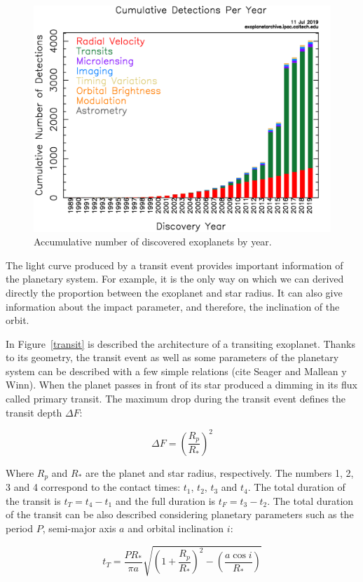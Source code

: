 \begin{figure}[H]
\centering
\includegraphics[width=0.7\columnwidth]{imagenes/exo_dischist_cumulative.png}
\caption{Accumulative number of discovered exoplanets by year.}
\label{amount_exoplanet}
\end{figure}

The light curve produced by a transit event provides important information of the planetary system. For example, it is the only way on which we can derived directly the proportion between the exoplanet and star radius. It can also give information about the impact parameter, and therefore, the inclination of the orbit. 

In Figure~\ref{transit} is described the architecture of a transiting exoplanet. Thanks to its geometry, the transit event as well as some parameters of the planetary system can be described with a few simple relations (cite Seager and Mallean y Winn).  When the planet passes in front of its star produced a dimming in its flux called primary transit. The maximum drop during the transit event defines the transit depth $\Delta{F}$:

\begin{equation}
    \Delta{F} = \left(\frac{R_{p}}{R_{*}}\right)^2 
\end{equation}

Where $R_{p}$ and $R_{*}$ are the planet and star radius, respectively. The numbers 1, 2, 3 and 4 correspond to the contact times: $t_{1}$, $t_{2}$, $t_{3}$ and $t_{4}$. The total duration of the transit is $t_{T} = t_{4}-t_{1}$ and the full duration is $t_{F}=t_{3}-t_{2}$. The total duration of the transit can be also described considering planetary parameters such as the period $P$, semi-major axis $a$ and orbital inclination $i$:

\begin{equation}
    t_{T} = \frac{PR_{*}}{\pi a} \sqrt{\left(1+\frac{R_{p}}{R_{*}}\right)^2-\left(\frac{a\cos i}{R_{*}}\right)}
\end{equation}

